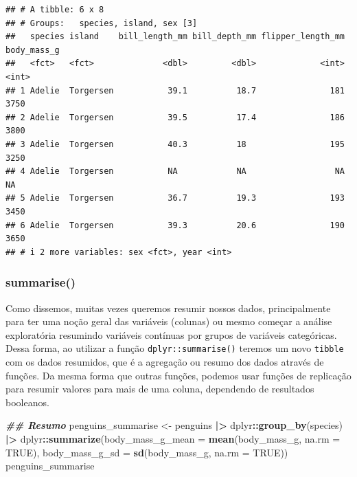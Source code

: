\documentclass[
]{article}
\newenvironment{Shaded}{\begin{snugshade}}{\end{snugshade}}
\newcommand{\AttributeTok}[1]{\textcolor[rgb]{0.13,0.29,0.53}{#1}}
\newcommand{\ConstantTok}[1]{\textcolor[rgb]{0.56,0.35,0.01}{#1}}
\newcommand{\DocumentationTok}[1]{\textcolor[rgb]{0.56,0.35,0.01}{\textbf{\textit{#1}}}}
\newcommand{\FunctionTok}[1]{\textcolor[rgb]{0.13,0.29,0.53}{\textbf{#1}}}
\newcommand{\NormalTok}[1]{#1}
\newcommand{\OtherTok}[1]{\textcolor[rgb]{0.56,0.35,0.01}{#1}}
\newcommand{\SpecialCharTok}[1]{\textcolor[rgb]{0.81,0.36,0.00}{\textbf{#1}}}
\begin{document}
\begin{verbatim}
## # A tibble: 6 x 8
## # Groups:   species, island, sex [3]
##   species island    bill_length_mm bill_depth_mm flipper_length_mm body_mass_g
##   <fct>   <fct>              <dbl>         <dbl>             <int>       <int>
## 1 Adelie  Torgersen           39.1          18.7               181        3750
## 2 Adelie  Torgersen           39.5          17.4               186        3800
## 3 Adelie  Torgersen           40.3          18                 195        3250
## 4 Adelie  Torgersen           NA            NA                  NA          NA
## 5 Adelie  Torgersen           36.7          19.3               193        3450
## 6 Adelie  Torgersen           39.3          20.6               190        3650
## # i 2 more variables: sex <fct>, year <int>
\end{verbatim}

\hypertarget{summarise}{%
\subsubsection{summarise()}\label{summarise}}

Como dissemos, muitas vezes queremos resumir nossos dados, principalmente para ter uma noção geral das variáveis (colunas) ou mesmo começar a análise exploratória resumindo variáveis contínuas por grupos de variáveis categóricas. Dessa forma, ao utilizar a função \texttt{dplyr::summarise()} teremos um novo \texttt{tibble} com os dados resumidos, que é a agregação ou resumo dos dados através de funções. Da mesma forma que outras funções, podemos usar funções de replicação para resumir valores para mais de uma coluna, dependendo de resultados booleanos.

\begin{Shaded}
\begin{Highlighting}[]
\DocumentationTok{\#\# Resumo}
\NormalTok{penguins\_summarise }\OtherTok{\textless{}{-}}\NormalTok{ penguins }\SpecialCharTok{|\textgreater{}} 
\NormalTok{    dplyr}\SpecialCharTok{::}\FunctionTok{group\_by}\NormalTok{(species) }\SpecialCharTok{|\textgreater{}} 
\NormalTok{    dplyr}\SpecialCharTok{::}\FunctionTok{summarize}\NormalTok{(}\AttributeTok{body\_mass\_g\_mean =} \FunctionTok{mean}\NormalTok{(body\_mass\_g, }\AttributeTok{na.rm =} \ConstantTok{TRUE}\NormalTok{),}
                     \AttributeTok{body\_mass\_g\_sd =} \FunctionTok{sd}\NormalTok{(body\_mass\_g, }\AttributeTok{na.rm =} \ConstantTok{TRUE}\NormalTok{))}
\NormalTok{penguins\_summarise}
\end{Highlighting}
\end{Shaded}
\end{document}
